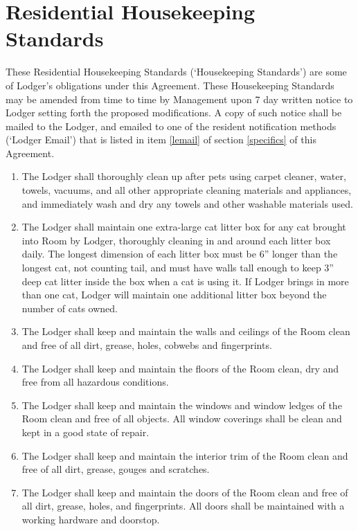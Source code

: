 \documentclass[12pt,letterpaper]{article}
\newcommand{\standards}{Residential Housekeeping Standards}	%
\newcommand{\management}{Management}
\newcommand{\room}{Room}
\newcommand{\lodger}{Lodger}
\newcommand{\lemail}{Lodger Email}
\begin{document}
\newpage
\section{\standards{}} \label{standards}

These \standards{} (`Housekeeping Standards') are some of \lodger{}'s obligations under this Agreement. These Housekeeping Standards may be amended from time to time by \management{} upon 7 day written notice to \lodger{} setting forth the proposed modifications. A copy of such notice shall be mailed to the \lodger{}, and emailed to one of the resident notification methods (`\lemail{}') that is listed in item \ref{lemail} of section \ref{specifics} of this Agreement. 
\begin{enumerate}
	\item The \lodger{} shall thoroughly clean up after pets using carpet cleaner, water, towels, vacuums, and all other appropriate cleaning materials and appliances, and immediately wash and dry any towels and other washable materials used.
	\item The \lodger{} shall maintain one extra-large cat litter box for any cat brought into \room{} by \lodger{}, thoroughly cleaning in and around each litter box daily. The longest dimension of each litter box must be 6'' longer than the longest cat, not counting tail, and must have walls tall enough to keep 3'' deep cat litter inside the box when a cat is using it. If \lodger{} brings in more than one cat, \lodger{} will maintain one additional litter box beyond the number of cats owned.
	\item The \lodger{} shall keep and maintain the walls and ceilings of the \room{} clean and free of all dirt, grease, holes, cobwebs and fingerprints. 
	\item The \lodger{} shall keep and maintain the floors of the \room{} clean, dry and free from all hazardous conditions. 
	\item The \lodger{} shall keep and maintain the windows and window ledges of the \room{} clean and free of all objects. All window coverings shall be clean and kept in a good state of repair. 
	\item The \lodger{} shall keep and maintain the interior trim of the \room{} clean and free of all dirt, grease, gouges and scratches. 
	\item The \lodger{} shall keep and maintain the doors of the \room{} clean and free of all dirt, grease, holes, and fingerprints. All doors shall be maintained with a working hardware and doorstop. 

\end{enumerate}
\end{document}
